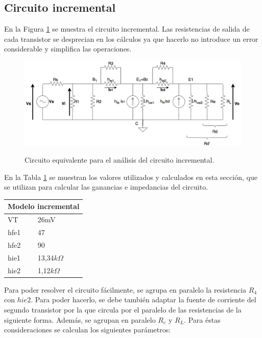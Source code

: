 	\subsection{Circuito incremental}
	
	En la Figura \ref{circ_incremental} se muestra el circuito incremental. Las resistencias de salida de cada transistor se desprecian en los cálculos ya que hacerlo no introduce un error considerable y simplifica las operaciones.
		\begin{figure}[H]
			\centering
			\includegraphics[scale=0.4]{./Imagenes/circ_incremental.png} \\
			\caption{Circuito equivalente para el an\'alisis del circuito incremental.}
			\label{circ_incremental}
		\end{figure}

En la Tabla \ref{tabla_valores_incremental} se muestran los valores utilizados y calculados en esta sección, que se utilizan para calcular las ganancias e impedancias del circuito.

\begin{table}[H]
\centering
\begin{tabular}{ll}
\multicolumn{2}{l}{Modelo incremental} \\ \hline
VT              & 26mV             \\
hfe1            & 47            \\
hfe2            & 90            \\
hie1            & 13,34$k\Omega$            \\
hie2            & 1,12$k\Omega$             \\
\end{tabular}
\label{tabla_valores_incremental} 
\end{table}

Para poder resolver el circuito fácilmente, se agrupa en paralelo la resistencia $R_4$ con $hie2$. Para poder hacerlo, se debe también adaptar la fuente de corriente del segundo transistor por la que circula por el paralelo de las resistencias de la siguiente forma. Además, se agrupan en paralelo $R_e$ y $R_L$. Para éstas consideraciones se calculan los siguientes parámetros:

